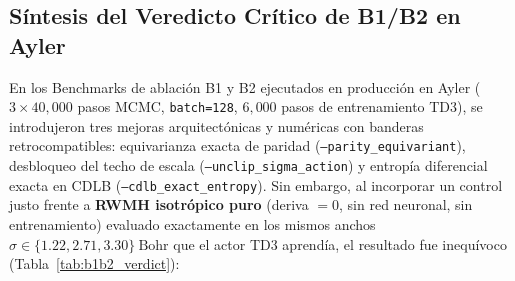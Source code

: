 \documentclass[10pt,a4paper]{article}
\begin{document}
\subsection{Síntesis del Veredicto Crítico de B1/B2 en Ayler}

En los Benchmarks de ablación B1 y B2 ejecutados en producción en Ayler ($3 \times 40{,}000$ pasos MCMC, \texttt{batch=128}, $6{,}000$ pasos de entrenamiento TD3), se introdujeron tres mejoras arquitectónicas y numéricas con banderas retrocompatibles: equivarianza exacta de paridad (\texttt{--parity\_equivariant}), desbloqueo del techo de escala (\texttt{--unclip\_sigma\_action}) y entropía diferencial exacta en CDLB (\texttt{--cdlb\_exact\_entropy}). Sin embargo, al incorporar un control justo frente a \textbf{RWMH isotrópico puro} (deriva $=0$, sin red neuronal, sin entrenamiento) evaluado exactamente en los mismos anchos $\sigma \in \{1.22, 2.71, 3.30\}\ \mathrm{Bohr}$ que el actor TD3 aprendía, el resultado fue inequívoco (Tabla~\ref{tab:b1b2_verdict}):
\end{document}

